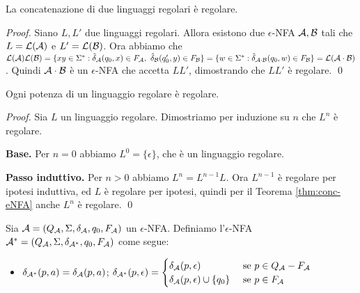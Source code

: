 \documentclass[runningheads,a4paper]{llncs}
\begin{document}
\begin{theorem}[Concatenazione]\label{thm:conc-eNFA}
La concatenazione di due linguaggi regolari \`{e} regolare.
\end{theorem}

\begin{proof}
Siano $L,L'$ due linguaggi regolari. Allora esistono due $\epsilon$-NFA $\mathcal{A},\mathcal{B}$ tali che $L = \mathcal{L}(\mathcal{A})$ e $L' = \mathcal{L}(\mathcal{B})$. Ora abbiamo che $\mathcal{L}(\mathcal{A})\mathcal{L}(\mathcal{B}) = \{xy \in \Sigma^* : \hat{\delta}_{\mathcal{A}}(q_0,x) \in F_{\mathcal{A}},\ \hat{\delta}_{\mathcal{B}}(q_0',y) \in F_{\mathcal{B}}\} = \{w \in \Sigma^* : \hat{\delta}_{\mathcal{A}\cdot\mathcal{B}}(q_0,w) \in F_{\mathcal{B}}\} = \mathcal{L}(\mathcal{A}\cdot\mathcal{B})$. Quindi $\mathcal{A}\cdot\mathcal{B}$ \`{e} un $\epsilon$-NFA che accetta $LL'$, dimostrando che $LL'$ \`{e} regolare.
\qed\end{proof}

\begin{theorem}[Potenza]\label{thm:pot-eNFA}
Ogni potenza di un linguaggio regolare \`{e} regolare.
\end{theorem}

\begin{proof}
Sia $L$ un linguaggio regolare. Dimostriamo per induzione su $n$ che $L^n$ \`{e} regolare. 

\noindent\textbf{Base.} Per $n=0$ abbiamo $L^0 = \{\epsilon\}$, che \`{e} un linguaggio regolare. 

\noindent\textbf{Passo induttivo.} Per $n > 0$ abbiamo $L^n = L^{n-1}L$. Ora $L^{n-1}$ \`{e} regolare per ipotesi induttiva, ed $L$ \`{e} regolare per ipotesi, quindi per il Teorema \ref{thm:conc-eNFA} anche $L^n$ \`{e} regolare.
\qed\end{proof}

\begin{definition}\label{def:Kleene-eNFA}
Sia $\mathcal{A} = (Q_{\mathcal{A}},\Sigma,\delta_{\mathcal{A}},q_0,F_{\mathcal{A}})$ un $\epsilon$-NFA. Definiamo l'$\epsilon$-NFA $\mathcal{A}^*= (Q_{\mathcal{A}},\Sigma,\delta_{\mathcal{A}^*},q_0,F_{\mathcal{A}})$ come segue:
\begin{itemize}
\item $\delta_{\mathcal{A}^*}(p,a) = \delta_{\mathcal{A}}(p,a)$; \qquad 
$\delta_{\mathcal{A}^*}(p,\epsilon) =
\begin{cases}
\delta_{\mathcal{A}}(p,\epsilon) & \mbox{ se } p \in Q_{\mathcal{A}} - F_{\mathcal{A}} \\
\delta_{\mathcal{A}}(p,\epsilon) \cup \{q_0\} & \mbox{ se } p \in F_{\mathcal{A}} \\
\end{cases}$
\end{itemize}
\end{definition}
\end{document}

